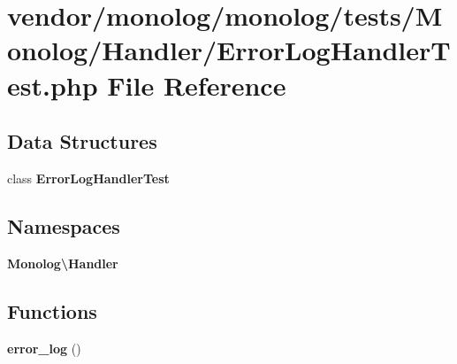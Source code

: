 \section{vendor/monolog/monolog/tests/\+Monolog/\+Handler/\+Error\+Log\+Handler\+Test.php File Reference}
\label{_error_log_handler_test_8php}
\subsection*{Data Structures}
\begin{DoxyCompactItemize}
\item 
class {\bf Error\+Log\+Handler\+Test}
\end{DoxyCompactItemize}
\subsection*{Namespaces}
\begin{DoxyCompactItemize}
\item 
 {\bf Monolog\textbackslash{}\+Handler}
\end{DoxyCompactItemize}
\subsection*{Functions}
\begin{DoxyCompactItemize}
\item 
{\bf error\+\_\+log} ()
\end{DoxyCompactItemize}
